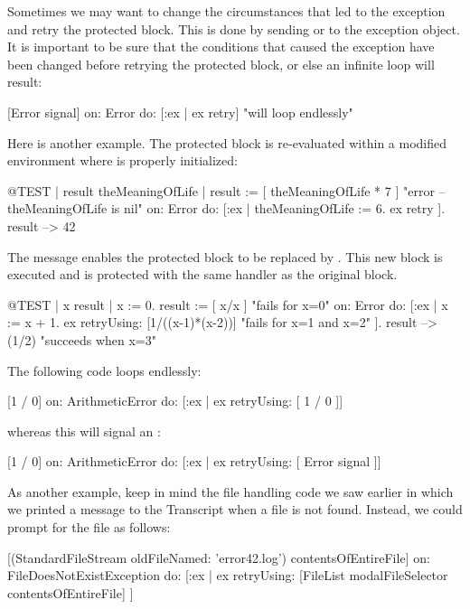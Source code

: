 Sometimes we may want to change the circumstances that led to the exception and retry the protected block. This is done by sending  or  to the exception object. It is important to be sure that the conditions that caused the exception have been changed before retrying the protected block, or else an infinite  loop will result:
\begin{code}{}
[Error signal] on: Error do: [:ex | ex retry]    "will loop endlessly"
\end{code}

Here is another example.
The protected block is re-evaluated within a modified environment where  is properly initialized:
\begin{code}{@TEST | result theMeaningOfLife |}
result := [ theMeaningOfLife * 7 ]    "error -- theMeaningOfLife is nil"
	on: Error
	do: [:ex | theMeaningOfLife := 6. ex retry ].
result --> 42
\end{code}

The message  enables the protected block to be replaced by . This new block is executed and is protected with the same handler as the original block.

\begin{code}{@TEST | x result |}
x := 0.
result := [ x/x ]    "fails for x=0"
	on: Error
	do: [:ex |
		x := x + 1.
		ex retryUsing: [1/((x-1)*(x-2))]    "fails for x=1 and x=2"
	].
result --> (1/2)    "succeeds when x=3"
\end{code}

The following code loops endlessly:
\begin{code}{}
[1 / 0] on: ArithmeticError do: [:ex | ex retryUsing: [ 1 / 0 ]]
\end{code}
whereas this will signal an : 
\begin{code}{}
[1 / 0] on: ArithmeticError do: [:ex | ex retryUsing: [ Error signal ]]
\end{code}

As another example, keep in mind the file handling code we saw earlier in which we printed a message to the Transcript when a file is not found. Instead, we could prompt for the file as follows:
\begin{code}{}
[(StandardFileStream oldFileNamed: 'error42.log') contentsOfEntireFile]
	on: FileDoesNotExistException
	do: [:ex | ex retryUsing: [FileList modalFileSelector contentsOfEntireFile] ]
\end{code}

